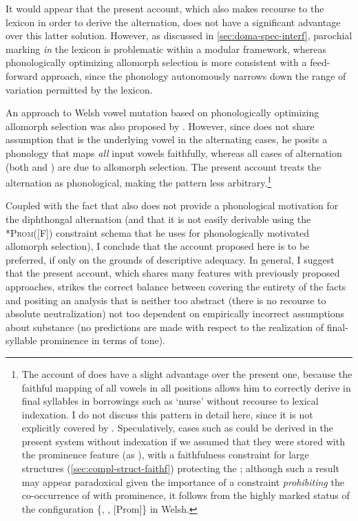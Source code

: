 It would appear that the present account, which also makes recourse to the lexicon in order to derive the \alternation{[u]}{[ə]} alternation, does not have a significant advantage over this latter solution. However, as discussed in \cref{sec:doma-spec-interf}, parochial marking \emph{in} the lexicon is problematic within a modular framework, whereas phonologically optimizing allomorph selection is more consistent with a feed\hyp forward approach, since the phonology autonomously narrows down the range of variation permitted by the lexicon.

An approach to Welsh vowel mutation based on phonologically optimizing allomorph selection was also proposed by \citet{greenbook}. However, since \citet{greenbook} does not share  assumption that \ipa{[ə]} is the underlying vowel in the alternating cases, he posits a phonology that maps \emph{all} input vowels faithfully, whereas all cases of alternation (\ie both \alternation{[u]}{[ə]} and \alternation{[ɨ]}{[ə]}) are due to allomorph selection. The present account treats the \alternation{[i]}{[ə]} alternation as phonological, making the pattern less arbitrary.\footnote{\label{fn:nurse}The account of \citet{greenbook} does have a slight advantage over the present one, because the faithful mapping of all vowels in all positions allows him to correctly derive \ipa{[ə]} in final syllables in borrowings such as \ipa{[ˈnərs]} `nurse' without recourse to lexical indexation. I do not discuss this pattern in detail here, since it is not explicitly covered by \citet{awbery86:_pembr_welsh}. Speculatively, cases such as \ipa{[ˈnərs]} could be derived in the present system without indexation if we assumed that they were stored with the prominence feature (\ie as ), with a faithfulness constraint for large structures (\cref{sec:compl-struct-faithf}) protecting the \ipa{[ə]}; although such a result may appear paradoxical given the importance of a constraint \emph{prohibiting} the co\hyp occurrence of \ipa{[ə]} with prominence, it follows from the highly marked status of the configuration \{, , [Prom]\} in Welsh.}

Coupled with the fact that \citet{greenbook} also does not provide a phonological motivation for the diphthongal alternation \alternation{[ai]}{[ei]} (and that it is not easily derivable using the *\textsc{Prom}([F]) constraint schema that he uses for phonologically motivated allomorph selection), I conclude that the account proposed here is to be preferred, if only on the grounds of descriptive adequacy. In general, I suggest that the present account, which shares many features with previously proposed approaches, strikes the correct balance between covering the entirety of the facts and positing an analysis that is neither too abstract (there is no recourse to absolute neutralization) not too dependent on empirically incorrect assumptions about substance (no predictions are made with respect to the realization of final\hyp syllable prominence in terms of tone).

